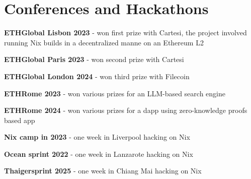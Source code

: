 \documentclass[]{cv}
\begin{document}
\begin{minipage}[t]{0.75\textwidth}
\section{Conferences and Hackathons}
\vspace{+0.5em}
\begin{tightemize}
\item \textbf{ETHGlobal Lisbon 2023} - won first prize with Cartesi, the project involved running Nix builds in a decentralized manne on an Ethereum L2
\item \textbf{ETHGlobal Paris 2023} - won second prize with Cartesi
\item \textbf{ETHGlobal London 2024} - won third prize with Filecoin
\item \textbf{ETHRome 2023} - won various prizes for an LLM-based search engine
\item \textbf{ETHRome 2024} - won various prizes for a dapp using zero-knowledge proofs based app
\item \textbf{Nix camp in 2023} - one week in Liverpool hacking on Nix
\item \textbf{Ocean sprint 2022} - one week in Lanzarote hacking on Nix
\item \textbf{Thaigersprint 2025} - one week in Chiang Mai hacking on Nix
\end{tightemize}
\sectionsep

\end{minipage}
\hfill
\end{document}
